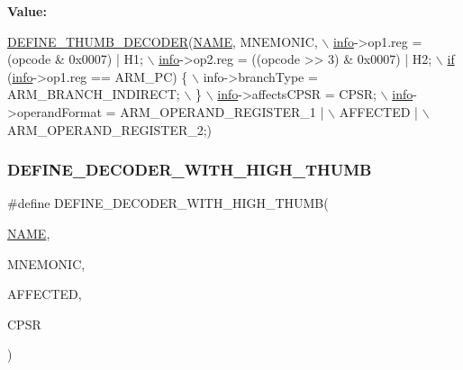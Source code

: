 {\bfseries Value\+:}
\begin{DoxyCode}
\mbox{\hyperlink{decoder-thumb_8c_a44d34ec3fd7c2c2ee51ff5966678c86e}{DEFINE\_THUMB\_DECODER}}(\mbox{\hyperlink{inflate_8h_a164ea0159d5f0b5f12a646f25f99eceaa67bc2ced260a8e43805d2480a785d312}{NAME}}, MNEMONIC, \(\backslash\)
        \mbox{\hyperlink{libretro_8h_structretro__game__info}{info}}->op1.reg = (opcode & 0x0007) | H1; \(\backslash\)
        \mbox{\hyperlink{libretro_8h_structretro__game__info}{info}}->op2.reg = ((opcode >> 3) & 0x0007) | H2; \(\backslash\)
        \mbox{\hyperlink{isa-arm_8c_a0736bf8f9c6b829a423d7d7a43b781e8}{if}} (\mbox{\hyperlink{libretro_8h_structretro__game__info}{info}}->op1.reg == ARM\_PC) \{ \(\backslash\)
            info->branchType = ARM\_BRANCH\_INDIRECT; \(\backslash\)
        \} \(\backslash\)
        \mbox{\hyperlink{libretro_8h_structretro__game__info}{info}}->affectsCPSR = CPSR; \(\backslash\)
        \mbox{\hyperlink{libretro_8h_structretro__game__info}{info}}->operandFormat = ARM\_OPERAND\_REGISTER\_1 | \(\backslash\)
            AFFECTED | \(\backslash\)
            ARM\_OPERAND\_REGISTER\_2;)
\end{DoxyCode}
\mbox{\label{decoder-thumb_8c_a1cdba0ed9acb6df2c67d9fd1b620ea06}} 
\subsubsection{\texorpdfstring{D\+E\+F\+I\+N\+E\+\_\+\+D\+E\+C\+O\+D\+E\+R\+\_\+\+W\+I\+T\+H\+\_\+\+H\+I\+G\+H\+\_\+\+T\+H\+U\+MB}{DEFINE\_DECODER\_WITH\_HIGH\_THUMB}}
{\footnotesize\ttfamily \#define D\+E\+F\+I\+N\+E\+\_\+\+D\+E\+C\+O\+D\+E\+R\+\_\+\+W\+I\+T\+H\+\_\+\+H\+I\+G\+H\+\_\+\+T\+H\+U\+MB(\begin{DoxyParamCaption}\item[{}]{\mbox{\hyperlink{inflate_8h_a164ea0159d5f0b5f12a646f25f99eceaa67bc2ced260a8e43805d2480a785d312}{N\+A\+ME}},  }\item[{}]{M\+N\+E\+M\+O\+N\+IC,  }\item[{}]{A\+F\+F\+E\+C\+T\+ED,  }\item[{}]{C\+P\+SR }\end{DoxyParamCaption})}


